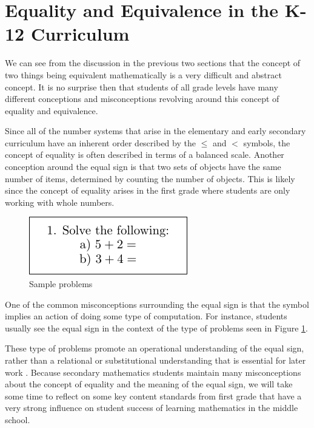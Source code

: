 \documentclass[
]{book}
\theoremstyle{definition}
\theoremstyle{definition}
\theoremstyle{definition}
\theoremstyle{definition}
\theoremstyle{remark}
\begin{document}
\hypertarget{equality-and-equivalence-in-the-k-12-curriculum}{%
\section{Equality and Equivalence in the K-12 Curriculum}\label{equality-and-equivalence-in-the-k-12-curriculum}}

We can see from the discussion in the previous two sections that the concept of two things being equivalent mathematically is a very difficult and abstract concept. It is no surprise then that students of all grade levels have many different conceptions and misconceptions revolving around this concept of equality and equivalence.

Since all of the number systems that arise in the elementary and early secondary curriculum have an inherent order described by the \(\leq\) and \(<\) symbols, the concept of equality is often described in terms of a balanced scale. Another conception around the equal sign is that two sets of objects have the same number of items, determined by counting the number of objects. This is likely since the concept of equality arises in the first grade where students are only working with whole numbers.

\begin{figure}

{\centering \includegraphics[width=0.35\linewidth]{tikz/sample_addition_problem} 

}

\caption{Sample problems}\label{fig:equality-operation}
\end{figure}

One of the common misconceptions surrounding the equal sign is that the symbol implies an action of doing some type of computation. For instance, students usually see the equal sign in the context of the type of problems seen in Figure \ref{fig:equality-operation}.

These type of problems promote an operational understanding of the equal sign, rather than a relational or substitutional understanding that is essential for later work \citep[pp.~145-150]{Cognition}. Because secondary mathematics students maintain many misconceptions about the concept of equality and the meaning of the equal sign, we will take some time to reflect on some key content standards from first grade that have a very strong influence on student success of learning mathematics in the middle school.
\end{document}
